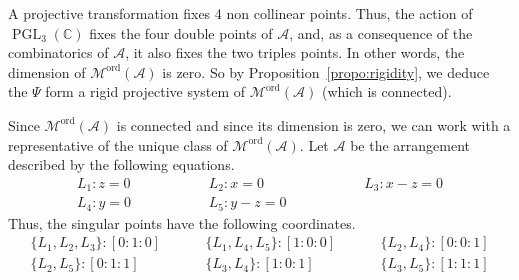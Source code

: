 \documentclass[11pt, a4paper]{amsart}
\theoremstyle{definition}
\theoremstyle{remark}
\newcommand{\CC}{\mathds{C}}
\newcommand{\A}{\mathcal{A}}
\newcommand{\M}{\mathcal{M}}
\newcommand{\ord}{\text{ord}}
\DeclareMathOperator{\PGL}{PGL}
\begin{document}
A projective transformation fixes 4 non collinear points. Thus, the action of $\PGL_3(\CC)$ fixes the four double points of $\A$, and, as a consequence of the combinatorics of $\A$, it also fixes the two triples points. In other words, the dimension of $\M^\ord(\A)$ is zero. So by Proposition~\ref{propo:rigidity}, we deduce the $\Psi$ form a rigid projective system of $\M^\ord(\A)$ (which is connected).

Since $\M^\ord(\A)$ is connected and since its dimension is zero, we can work with a representative of the unique class of $\M^\ord(\A)$. Let $\A$ be the arrangement described by the following equations.
\begin{equation*}
	\begin{array}{lll}
		L_1: z=0 \hspace{2cm} & L_2: x=0 \hspace{2cm} & L_3: x-z=0 \\
		L_4: y=0 \hspace{2cm} & L_5: y-z=0 \hspace{2cm} &
	\end{array}
\end{equation*}
Thus, the singular points have the following coordinates.
\begin{equation*}
	\begin{array}{lll}
		\{L_1,L_2,L_3\}: [0:1:0] \hspace{1cm} & \{L_1,L_4,L_5\}: [1:0:0] \hspace{1cm} & \{L_2, L_4\}: [0:0:1] \\
		\{L_2,L_5\}: [0:1:1] \hspace{1cm} & \{L_3, L_4\}: [1:0:1]  \hspace{1cm} & \{L_3,L_5\}: [1:1:1] 
	\end{array}
\end{equation*}
\end{document}
